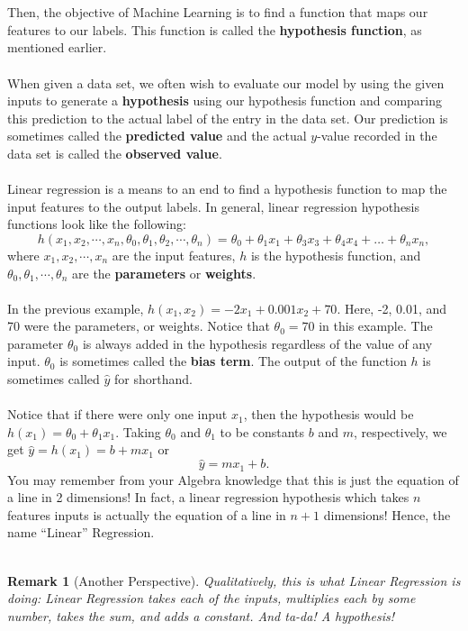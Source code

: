 \documentclass{article}
\newtheorem*{remark}{Remark}
\begin{document}
\\
\\
Then, the objective of Machine Learning is to find a function that maps our features to our labels. This function is called the \textbf{hypothesis function}, as mentioned earlier.
\\
\\
When given a data set, we often wish to evaluate our model by using the given inputs to generate a \textbf{hypothesis} using our hypothesis function and comparing this prediction to the actual label of the entry in the data set. Our prediction is sometimes called the \textbf{predicted value} and the actual $y$-value recorded in the data set is called the \textbf{observed value}. 
\\
\\
Linear regression is a means to an end to find a hypothesis function to map the input features to the output labels. In general, linear regression hypothesis functions look like the following:
\[h(x_1,x_2,\cdots,x_n,\theta_0,\theta_1,\theta_2,\cdots,\theta_n)=\theta_0+\theta_1x_1+\theta_3x_3+\theta_4x_4+\ldots+\theta_nx_n,\]
where $x_1,x_2,\cdots,x_n$ are the input features, $h$ is the hypothesis function, and $\theta_0,\theta_1,\cdots,\theta_n$ are the \textbf{parameters} or \textbf{weights}. 
\\
\\
In the previous example, $h(x_1,x_2)=-2x_1+0.001x_2+70$. Here, -2, 0.01, and 70 were the parameters, or weights. Notice that $\theta_0=70$ in this example. The parameter $\theta_0$ is always added in the hypothesis regardless of the value of any input. $\theta_0$ is sometimes called the \textbf{bias term}. The output of the function $h$ is sometimes called $\hat{y}$ for shorthand.
\\
\\
Notice that if there were only one input $x_1$, then the hypothesis would be $h(x_1)=\theta_0+\theta_1x_1$. Taking $\theta_0$ and $\theta_1$ to be constants $b$ and $m$, respectively, we get $\hat{y}=h(x_1)=b+mx_1$ or 
\[\hat{y}=mx_1+b.\]
You may remember from your Algebra knowledge that this is just the equation of a line in 2 dimensions! In fact, a linear regression hypothesis which takes $n$ features inputs is actually the equation of a line in $n+1$ dimensions! Hence, the name ``Linear'' Regression.
\\
\\
\begin{remark}[Another Perspective]
Qualitatively, this is what Linear Regression is doing: Linear Regression takes each of the inputs, multiplies each by some number, takes the sum, and adds a constant. And ta-da! A hypothesis!
\end{remark}
\end{document}
